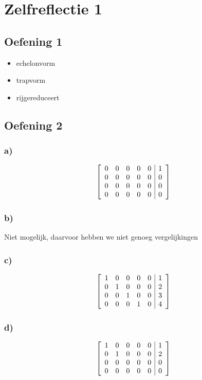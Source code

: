 \documentclass[lineaire_algebra_oplossingen.tex]{subfiles}
\begin{document}
\section{Zelfreflectie 1}
\subsection{Oefening 1}
\begin{itemize}
\item echelonvorm
\item trapvorm
\item rijgereduceert
\end{itemize}
\subsection{Oefening 2}
\subsubsection*{a)}
\[
\left[
\begin{array}{l l l l l | r}
0 & 0 & 0 & 0 & 0 & 1\\
0 & 0 & 0 & 0 & 0 & 0\\
0 & 0 & 0 & 0 & 0 & 0\\
0 & 0 & 0 & 0 & 0 & 0\\
\end{array}
\right]
\]
\subsubsection*{b)}
Niet mogelijk, daarvoor hebben we niet genoeg vergelijkingen
\subsubsection*{c)}
\[
\left[
\begin{array}{l l l l l | r}
1 & 0 & 0 & 0 & 0 & 1\\
0 & 1 & 0 & 0 & 0 & 2\\
0 & 0 & 1 & 0 & 0 & 3\\
0 & 0 & 0 & 1 & 0 & 4\\
\end{array}
\right]
\]
\subsubsection*{d)}
\[
\left[
\begin{array}{l l l l l | r}
1 & 0 & 0 & 0 & 0 & 1\\
0 & 1 & 0 & 0 & 0 & 2\\
0 & 0 & 0 & 0 & 0 & 0\\
0 & 0 & 0 & 0 & 0 & 0\\
\end{array}
\right]
\]
\end{document}
